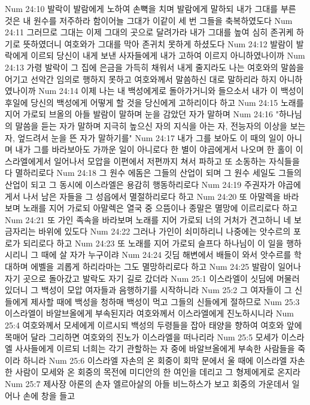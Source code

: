 Num 24:10  발락이 발람에게 노하여 손뼉을 치며 발람에게 말하되 내가 그대를 부른 것은 내 원수를 저주하라 함이어늘 그대가 이같이 세 번 그들을 축복하였도다
Num 24:11  그러므로 그대는 이제 그대의 곳으로 달려가라 내가 그대를 높여 심히 존귀케 하기로 뜻하였더니 여호와가 그대를 막아 존귀치 못하게 하셨도다
Num 24:12  발람이 발락에게 이르되 당신이 내게 보낸 사자들에게 내가 고하여 이르지 아니하였나이까
Num 24:13  가령 발락이 그 집에 은금을 가득히 채워서 내게 줄지라도 나는 여호와의 말씀을 어기고 선악간 임의로 행하지 못하고 여호와께서 말씀하신 대로 말하리라 하지 아니하였나이까
Num 24:14  이제 나는 내 백성에게로 돌아가거니와 들으소서 내가 이 백성이 후일에 당신의 백성에게 어떻게 할 것을 당신에게 고하리이다 하고
Num 24:15  노래를 지어 가로되 브올의 아들 발람이 말하며 눈을 감았던 자가 말하며
Num 24:16  "하나님의 말씀을 듣는 자가 말하며 지극히 높으신 자의 지식을 아는 자, 전능자의 이상을 보는 자, 엎드려서 눈을 뜬 자가 말하기를"
Num 24:17  내가 그를 보아도 이 때의 일이 아니며 내가 그를 바라보아도 가까운 일이 아니로다 한 별이 야곱에게서 나오며 한 홀이 이스라엘에게서 일어나서 모압을 이편에서 저편까지 쳐서 파하고 또 소동하는 자식들을 다 멸하리로다
Num 24:18  그 원수 에돔은 그들의 산업이 되며 그 원수 세일도 그들의 산업이 되고 그 동시에 이스라엘은 용감히 행동하리로다
Num 24:19  주권자가 야곱에게서 나서 남은 자들을 그 성읍에서 멸절하리로다 하고
Num 24:20  또 아말렉을 바라보며 노래를 지어 가로되 아말렉은 열국 중 으뜸이나 종말은 멸망에 이르리로다 하고
Num 24:21  또 가인 족속을 바라보며 노래를 지어 가로되 너의 거처가 견고하니 네 보금자리는 바위에 있도다
Num 24:22  그러나 가인이 쇠미하리니 나중에는 앗수르의 포로가 되리로다 하고
Num 24:23  또 노래를 지어 가로되 슬프다 하나님이 이 일을 행하시리니 그 때에 살 자가 누구이랴
Num 24:24  깃딤 해변에서 배들이 와서 앗수르를 학대하며 에벨을 괴롭게 하리라마는 그도 멸망하리로다 하고
Num 24:25  발람이 일어나 자기 곳으로 돌아갔고 발락도 자기 길로 갔더라
Num 25:1  이스라엘이 싯딤에 머물러 있더니 그 백성이 모압 여자들과 음행하기를 시작하니라
Num 25:2  그 여자들이 그 신들에게 제사할 때에 백성을 청하매 백성이 먹고 그들의 신들에게 절하므로
Num 25:3  이스라엘이 바알브올에게 부속된지라 여호와께서 이스라엘에게 진노하시니라
Num 25:4  여호와께서 모세에게 이르시되 백성의 두령들을 잡아 태양을 향하여 여호와 앞에 목매어 달라 그리하면 여호와의 진노가 이스라엘을 떠나리라
Num 25:5  모세가 이스라엘 사사들에게 이르되 너희는 각기 관할하는 자 중에 바알브올에게 부속한 사람들을 죽이라 하니라
Num 25:6  이스라엘 자손의 온 회중이 회막 문에서 울 때에 이스라엘 자손 한 사람이 모세와 온 회중의 목전에 미디안의 한 여인을 데리고 그 형제에게로 온지라
Num 25:7  제사장 아론의 손자 엘르아살의 아들 비느하스가 보고 회중의 가운데서 일어나 손에 창을 들고
